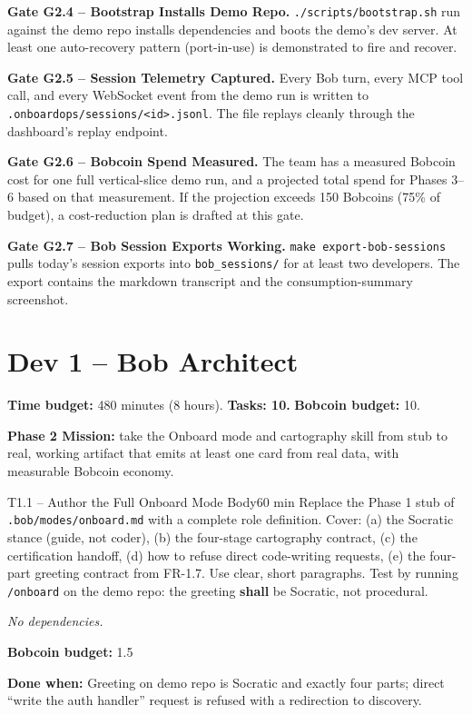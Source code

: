 \documentclass[11pt,letterpaper]{article}
\newcommand{\acceptance}[1]{\par\smallskip\textcolor{ibmgreen}{\textbf{Done when:}} #1}
\newcommand{\nodep}{\par\smallskip\textcolor{ibmgray}{\textit{No dependencies.}}}
\newcommand{\bobcost}[1]{\par\smallskip\textcolor{ibmaccent}{\textbf{Bobcoin budget:}} #1}
\newcommand{\shall}{\textbf{shall}}
\begin{document}
\begin{gate}
\textbf{Gate G2.4 -- Bootstrap Installs Demo Repo.} \texttt{./scripts/bootstrap.sh} run against the demo repo installs dependencies and boots the demo's dev server. At least one auto-recovery pattern (port-in-use) is demonstrated to fire and recover.
\end{gate}

\begin{gate}
\textbf{Gate G2.5 -- Session Telemetry Captured.} Every Bob turn, every MCP tool call, and every WebSocket event from the demo run is written to \texttt{.onboardops/sessions/<id>.jsonl}. The file replays cleanly through the dashboard's replay endpoint.
\end{gate}

\begin{gate}
\textbf{Gate G2.6 -- Bobcoin Spend Measured.} The team has a measured Bobcoin cost for one full vertical-slice demo run, and a projected total spend for Phases 3--6 based on that measurement. If the projection exceeds 150 Bobcoins (75\% of budget), a cost-reduction plan is drafted at this gate.
\end{gate}

\begin{gate}
\textbf{Gate G2.7 -- Bob Session Exports Working.} \texttt{make export-bob-sessions} pulls today's session exports into \texttt{bob\_sessions/} for at least two developers. The export contains the markdown transcript and the consumption-summary screenshot.
\end{gate}

\section{Dev 1 -- Bob Architect}

\textbf{Time budget:} 480 minutes (8 hours). \textbf{Tasks: 10.} \textbf{Bobcoin budget:} 10.

\textbf{Phase 2 Mission:} take the Onboard mode and cartography skill from stub to real, working artifact that emits at least one card from real data, with measurable Bobcoin economy.

\begin{task}{T1.1 -- Author the Full Onboard Mode Body}{60 min}
Replace the Phase 1 stub of \texttt{.bob/modes/onboard.md} with a complete role definition. Cover: (a) the Socratic stance (guide, not coder), (b) the four-stage cartography contract, (c) the certification handoff, (d) how to refuse direct code-writing requests, (e) the four-part greeting contract from FR-1.7. Use clear, short paragraphs. Test by running \texttt{/onboard} on the demo repo: the greeting \shall{} be Socratic, not procedural.
\nodep
\bobcost{1.5}
\acceptance{Greeting on demo repo is Socratic and exactly four parts; direct ``write the auth handler'' request is refused with a redirection to discovery.}
\end{task}
\end{document}
